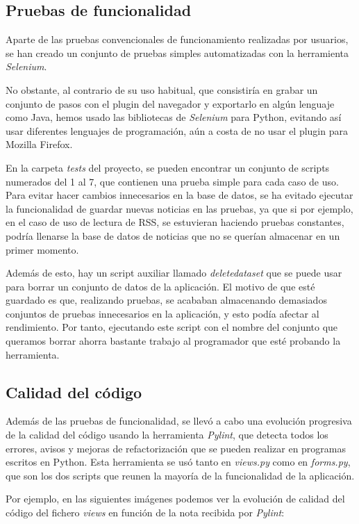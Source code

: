 \subsection{Pruebas de funcionalidad}

Aparte de las pruebas convencionales de funcionamiento realizadas por usuarios, se han creado un conjunto de pruebas simples automatizadas con la herramienta \emph{Selenium}. 

No obstante, al contrario de su uso habitual, que consistiría en grabar un conjunto de pasos con el plugin del navegador y exportarlo en algún lenguaje como Java, hemos usado las bibliotecas de \emph{Selenium} para Python, evitando así usar diferentes lenguajes de programación, aún a costa de no usar el plugin para Mozilla Firefox.

En la carpeta \emph{tests} del proyecto, se pueden encontrar un conjunto de scripts numerados del 1 al 7, que contienen una prueba simple para cada caso de uso. Para evitar hacer cambios innecesarios en la base de datos, se ha evitado ejecutar la funcionalidad de guardar nuevas noticias en las pruebas, ya que si por ejemplo, en el caso de uso de lectura de RSS, se estuvieran haciendo pruebas constantes, podría llenarse la base de datos de noticias que no se querían almacenar en un primer momento.

Además de esto, hay un script auxiliar llamado \emph{deletedataset} que se puede usar para borrar un conjunto de datos de la aplicación. El motivo de que esté guardado es que, realizando pruebas, se acababan almacenando demasiados conjuntos de pruebas innecesarios en la aplicación, y esto podía afectar al rendimiento. Por tanto, ejecutando este script con el nombre del conjunto que queramos borrar ahorra bastante trabajo al programador que esté probando la herramienta.

\subsection{Calidad del código}
Además de las pruebas de funcionalidad, se llevó a cabo una evolución progresiva de la calidad del código usando la herramienta \emph{Pylint}, que detecta todos los errores, avisos y mejoras de refactorización que se pueden realizar en programas escritos en Python. Esta herramienta se usó tanto en \emph{views.py} como en \emph{forms.py}, que son los dos scripts que reunen la mayoría de la funcionalidad de la aplicación.

Por ejemplo, en las siguientes imágenes podemos ver la evolución de calidad del código del fichero \emph{views} en función de la nota recibida por \emph{Pylint}:

